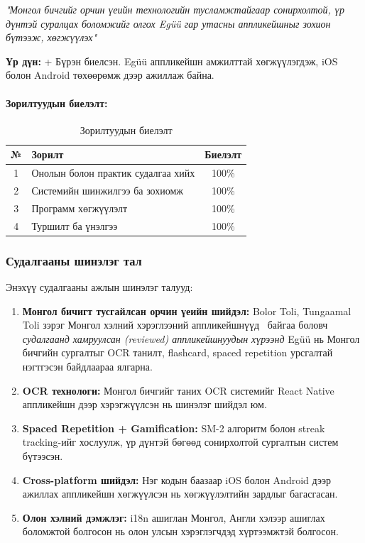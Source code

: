 \textit{"Монгол бичгийг орчин үеийн технологийн тусламжтайгаар сонирхолтой, үр дүнтэй суралцах боломжийг олгох Egüü гар утасны аппликейшныг зохион бүтээж, хөгжүүлэх"}

\textbf{Үр дүн:} + Бүрэн биелсэн. Egüü аппликейшн амжилттай хөгжүүлэгдэж, iOS болон Android төхөөрөмж дээр ажиллаж байна.

\paragraph{Зорилтуудын биелэлт:}

\begin{table}[H]
\centering
\caption{Зорилтуудын биелэлт}
\label{tab:objectives-completion}

\begin{tabular}{|c|l|c|}
\hline
\textbf{№} & \textbf{Зорилт} & \textbf{Биелэлт} \\
\hline
1 & Онолын болон практик судалгаа хийх & 100\% \\
\hline
2 & Системийн шинжилгээ ба зохиомж & 100\% \\
\hline
3 & Программ хөгжүүлэлт & 100\% \\
\hline
4 & Туршилт ба үнэлгээ & 100\% \\
\hline
\end{tabular}

\end{table} 

\subsubsection{Судалгааны шинэлэг тал}
\label{subsec:novelty}

Энэхүү судалгааны ажлын шинэлэг талууд:

\begin{enumerate}
    \item \textbf{Монгол бичигт тусгайлсан орчин үеийн шийдэл:} Bolor Toli, Tungaamal Toli зэрэг Монгол хэлний хэрэглээний аппликейшнүүд~\cite{bolor-toli,tungaamal-toli} байгаа боловч \textit{судалгаанд хамруулсан (reviewed) аппликейшнуудын хүрээнд} Egüü нь Монгол бичгийн сургалтыг OCR танилт, flashcard, spaced repetition урсгалтай нэгтгэсэн байдлаараа ялгарна.
    
    \item \textbf{OCR технологи:} Монгол бичгийг таних OCR системийг React Native аппликейшн дээр хэрэгжүүлсэн нь шинэлэг шийдэл юм.
    
    \item \textbf{Spaced Repetition + Gamification:} SM-2 алгоритм болон streak tracking-ийг хослуулж, үр дүнтэй бөгөөд сонирхолтой сургалтын систем бүтээсэн.
    
    \item \textbf{Cross-platform шийдэл:} Нэг кодын баазаар iOS болон Android дээр ажиллах аппликейшн хөгжүүлсэн нь хөгжүүлэлтийн зардлыг багасгасан.
    
    \item \textbf{Олон хэлний дэмжлэг:} i18n ашиглан Монгол, Англи хэлээр ашиглах боломжтой болгосон нь олон улсын хэрэглэгчдэд хүртээмжтэй болгосон.
\end{enumerate}

